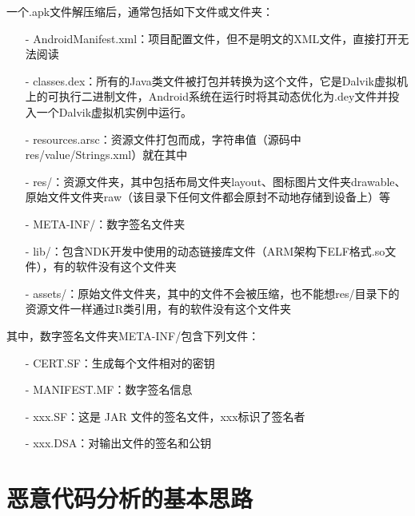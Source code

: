 一个.apk文件解压缩后，通常包括如下文件或文件夹：
\begin{itemize}
	\item[-] AndroidManifest.xml：项目配置文件，但不是明文的XML文件，直接打开无法阅读
	\item[-] classes.dex：所有的Java类文件被打包并转换为这个文件，它是Dalvik虚拟机上的可执行二进制文件，Android系统在运行时将其动态优化为.dey文件并投入一个Dalvik虚拟机实例中运行。
	\item[-] resources.arsc：资源文件打包而成，字符串值（源码中res/value/Strings.xml）就在其中
	\item[-] res/：资源文件夹，其中包括布局文件夹layout、图标图片文件夹drawable、原始文件文件夹raw（该目录下任何文件都会原封不动地存储到设备上）等
	\item[-] META-INF/：数字签名文件夹
	\item[-] lib/：包含NDK开发中使用的动态链接库文件（ARM架构下ELF格式.so文件），有的软件没有这个文件夹
	\item[-] assets/：原始文件文件夹，其中的文件不会被压缩，也不能想res/目录下的资源文件一样通过R类引用，有的软件没有这个文件夹
\end{itemize}
其中，数字签名文件夹META-INF/包含下列文件：
\begin{itemize}
	\item[-] CERT.SF：生成每个文件相对的密钥
	\item[-] MANIFEST.MF：数字签名信息
	\item[-] xxx.SF：这是 JAR 文件的签名文件，xxx标识了签名者
	\item[-] xxx.DSA：对输出文件的签名和公钥
\end{itemize}
\section{恶意代码分析的基本思路}
